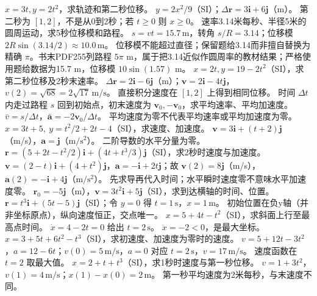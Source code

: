 \problemtext $x=3t,y=2t^2$，求轨迹和第二秒位移。
\workings $y=2x^2/9$（SI）；$\Delta\bm r=3\bm i+6\bm j$（m）。
\crosscheck 第二秒为 $[1,2]$，不是从0到2秒；若 $t\ge0$ 则 $x\ge0$。
\problemtext 速率3.14米每秒、半径5米的圆周运动，求5秒位移模和路程。
\workings $s=vt=15.7\,\mathrm m$，转角 $s/R=3.14$；位移模 $2R\sin(3.14/2)\approx10.0\,\mathrm m$。
\crosscheck 位移模不能超过直径；保留题给3.14而非擅自替换为精确 $\pi$。书末PDF255列路程 $5\pi$ m，属于把3.14近似作圆周率的教材结果；严格使用题给数据为15.7 m，位移模 $10\sin(1.57)$ m。
\problemtext $x=2t,y=19-2t^2$（SI），求第二秒位移及2秒末速率。
\workings $\Delta\bm r=2\bm i-6\bm j$（m）；$\bm v=2\bm i-4t\bm j$，$v(2)=\sqrt{68}=2\sqrt{17}\,\mathrm{m/s}$。
\crosscheck 直接积分速度在 $[1,2]$ 上得到相同位移。
\problemtext 时间 $\Delta t$ 内走过路程 $s$ 回到初始点，初末速度为 $\bm v_0,-\bm v_0$，求平均速率、平均加速度。
\workings $\bar v=s/\Delta t$，$\bar{\bm a}=-2\bm v_0/\Delta t$。
\crosscheck 平均速度为零不代表平均速率或平均加速度为零。
\problemtext $x=3t+5,\ y=t^2/2+2t-4$（SI），求速度、加速度。
\workings $\bm v=3\bm i+(t+2)\bm j$（m/s），$\bm a=\bm j$（$\mathrm{m/s^2}$）。
\crosscheck 二阶导数的水平分量为零。
\problemtext $\bm r=(5+2t-t^2/2)\bm i+(4t+t^3/3)\bm j$（SI），求2秒时速度与加速度。
\workings $\bm v=(2-t)\bm i+(4+t^2)\bm j$，$\bm a=-\bm i+2t\bm j$；故 $\bm v(2)=8\bm j$（m/s），$\bm a(2)=-\bm i+4\bm j$（$\mathrm{m/s^2}$）。
\crosscheck 先求导再代入时间；水平瞬时速度零不意味水平加速度零。
\problemtext $\bm r_0=-5\bm j$（m），$\bm v=3t^2\bm i+5\bm j$（SI），求到达横轴的时间、位置。
\workings $\bm r=t^3\bm i+(5t-5)\bm j$（SI）；令 $y=0$ 得 $t=1\,\mathrm s$，$x=1\,\mathrm m$。
\crosscheck 初始位置在负y轴（并非坐标原点），纵向速度恒正，交点唯一。
\problemtext $x=5+4t-t^2$（SI），求斜面上行至最高点时间。
\workings $\dot x=4-2t=0$ 给出 $t=2\,\mathrm s$。
\crosscheck $\ddot x=-2<0$，是最大坐标。
\problemtext $x=3+5t+6t^2-t^3$（SI），求初速度、加速度为零时的速度。
\workings $v=5+12t-3t^2$，$a=12-6t$；$v(0)=5\,\mathrm{m/s}$，$a=0$ 对应 $t=2\,\mathrm s$，$v=17\,\mathrm{m/s}$。
\crosscheck 速度函数在 $t=2$ 取最大值。
\problemtext $x=2+t+t^3$（SI），求1秒时速度与第一秒位移。
\workings $v=1+3t^2$，$v(1)=4\,\mathrm{m/s}$；$x(1)-x(0)=2\,\mathrm m$。
\crosscheck 第一秒平均速度为2米每秒，与末速度不同。
